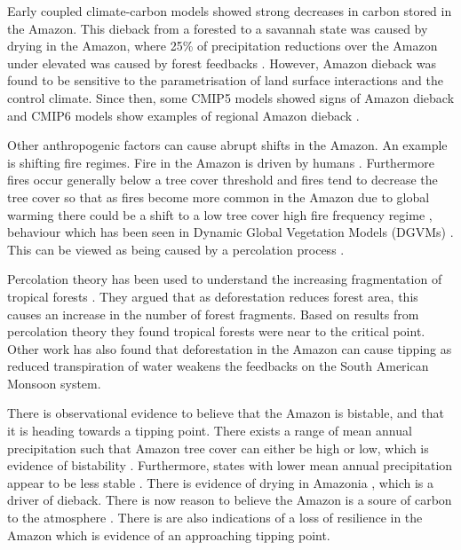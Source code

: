 Early coupled climate-carbon models \parencite{Cox2000} showed strong decreases in carbon stored in the Amazon. This dieback \parencite{Cox2004}  from a forested to a savannah state was
caused by drying in the Amazon, where 25\% of precipitation reductions over the Amazon under elevated  was caused by forest feedbacks \parencite{Betts2004}.
However, Amazon dieback was found to be sensitive to the parametrisation of land surface interactions and the control climate\parencite{Huntingford2004}. Since then,
some CMIP5 models \parencite{Drijfhout2015} showed signs of Amazon dieback and CMIP6 models show examples of regional Amazon dieback \parencite{Parry2022}.

Other anthropogenic factors can cause abrupt shifts in the Amazon. An example is shifting fire regimes. Fire in the Amazon is driven by humans \parencite{UNEP2002}.
Furthermore fires occur generally below a tree cover threshold \parencite{Wuyts2017} and fires tend to decrease the tree cover so that as fires become more common in the
Amazon due to global warming \parencite{Cochrane2009} there could be a shift to a low tree cover high fire frequency regime \parencite{Wuyts2022}, behaviour
which has been seen in Dynamic Global Vegetation Models (DGVMs) \parencite{Lasslop2016}. This can be viewed
as being caused by a percolation process \parencite{Schertzer2015,Cardoso2022}.

Percolation theory has been used to understand the increasing fragmentation of tropical forests \parencite{Taubert2018}. They argued that as deforestation reduces forest area,
this causes an increase in the number of forest fragments. Based on results from percolation theory \parencite{Stauffer1994} they found tropical forests were near to the critical point.
Other work \parencite{Boers2017} has also found that deforestation in the Amazon can cause tipping as reduced transpiration of water weakens the feedbacks on the South American Monsoon system. 

There is observational evidence to believe that the Amazon is bistable, and that it is heading towards a tipping point. There exists a range of mean annual precipitation
such that Amazon tree cover can either be high or low, which is evidence of bistability \parencite{Hirota2011,Staver2011}.  Furthermore, states with lower mean annual
precipitation appear to be less stable \parencite{Ciemer2019}. There is evidence of drying in Amazonia \parencite{Ritchie2022}, which is a driver of dieback. There is now reason to
believe the Amazon is a soure of carbon to the atmosphere \parencite{Gatti2021}. There is are also indications of a loss of resilience in the Amazon \parencite{Boulton2022} which is
evidence of an approaching tipping point.

